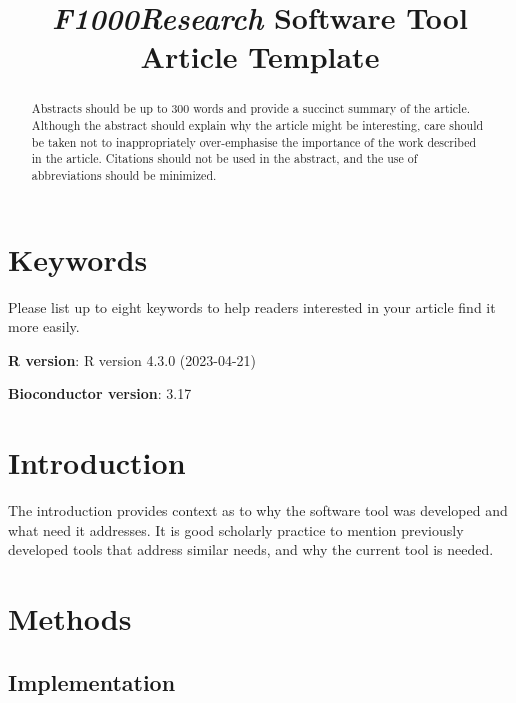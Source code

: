 \documentclass[9pt,a4paper,]{extarticle}
\begin{document}
\pagestyle{front}

\title{\emph{F1000Research} Software Tool Article Template}


\maketitle
\thispagestyle{front}

\begin{abstract}
Abstracts should be up to 300 words and provide a succinct summary of the article. Although the abstract should explain why the article might be interesting, care should be taken not to inappropriately over-emphasise the importance of the work described in the article. Citations should not be used in the abstract, and the use of abbreviations should be minimized.
\end{abstract}

\section*{Keywords}
Please list up to eight keywords to help readers interested in your article find it more easily.


\clearpage
\pagestyle{main}

\textbf{R version}: R version 4.3.0 (2023-04-21)

\textbf{Bioconductor version}: 3.17

\hypertarget{introduction}{%
\section{Introduction}\label{introduction}}

The introduction provides context as to why the software tool was developed and what need it addresses. It is good scholarly practice to mention previously developed tools that address similar needs, and why the current tool is needed.

\hypertarget{methods}{%
\section{Methods}\label{methods}}

\hypertarget{implementation}{%
\subsection{Implementation}\label{implementation}}
\end{document}
